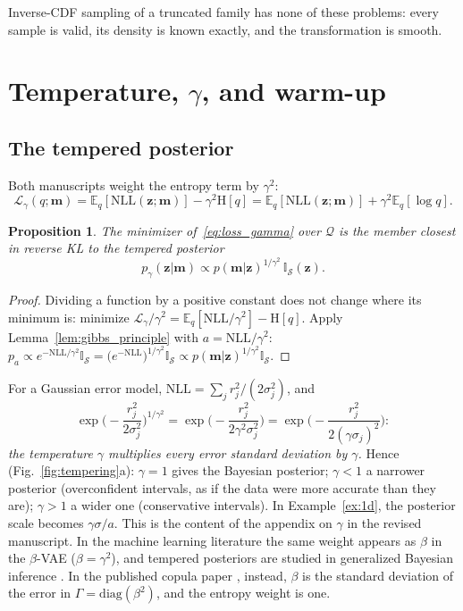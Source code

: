 \documentclass[11pt,a4paper]{article}
\numberwithin{equation}{section}
\theoremstyle{plain}
\newtheorem{proposition}{Proposition}[section]
\theoremstyle{definition}
\theoremstyle{remark}
\newcommand{\m}{\mathbf{m}}
\newcommand{\z}{\mathbf{z}}
\newcommand{\Sset}{\mathcal{S}}
\newcommand{\E}{\mathbb{E}}
\newcommand{\Hent}{\mathrm{H}}
\newcommand{\NLL}{\mathrm{NLL}}
\newcommand{\Lc}{\mathcal{L}}
\newcommand{\ind}{\mathbb{I}}
\begin{document}
Inverse-CDF sampling of a truncated family has none of these problems: every sample is valid, its density is known exactly, and the transformation is smooth.

\section{Temperature, $\gamma$, and warm-up}
\label{sec:tempering}

\subsection{The tempered posterior}
Both manuscripts weight the entropy term by $\gamma^2$:
\begin{equation}
\Lc_\gamma(q;\m)=\E_q[\NLL(\z;\m)]-\gamma^2\Hent[q]=\E_q[\NLL(\z;\m)]+\gamma^2\E_q[\log q].
\label{eq:loss_gamma}
\end{equation}
\begin{proposition}
\label{prop:tempered}
The minimizer of~\eqref{eq:loss_gamma} over $\mathcal Q$ is the member closest in reverse KL to the tempered posterior
\begin{equation}
p_\gamma(\z|\m)\propto p(\m|\z)^{1/\gamma^2}\,\ind_{\Sset}(\z).
\end{equation}
\end{proposition}
\begin{proof}
Dividing a function by a positive constant does not change where its minimum is: minimize $\Lc_\gamma/\gamma^2=\E_q[\NLL/\gamma^2]-\Hent[q]$. Apply Lemma~\ref{lem:gibbs_principle} with $a=\NLL/\gamma^2$: $p_a\propto e^{-\NLL/\gamma^2}\ind_{\Sset}=\big(e^{-\NLL}\big)^{1/\gamma^2}\ind_{\Sset}\propto p(\m|\z)^{1/\gamma^2}\ind_{\Sset}$.
\end{proof}
For a Gaussian error model, $\NLL=\sum_jr_j^2/(2\sigma_j^2)$, and
\begin{equation*}
\exp\Big(-\frac{r_j^2}{2\sigma_j^2}\Big)^{1/\gamma^2}=\exp\Big(-\frac{r_j^2}{2\gamma^2\sigma_j^2}\Big)=\exp\Big(-\frac{r_j^2}{2(\gamma\sigma_j)^2}\Big):
\end{equation*}
\emph{the temperature $\gamma$ multiplies every error standard deviation by $\gamma$.} Hence (Fig.~\ref{fig:tempering}a): $\gamma=1$ gives the Bayesian posterior; $\gamma<1$ a narrower posterior (overconfident intervals, as if the data were more accurate than they are); $\gamma>1$ a wider one (conservative intervals). In Example~\ref{ex:1d}, the posterior scale becomes $\gamma\sigma/a$. This is the content of the appendix on $\gamma$ in the revised manuscript. In the machine learning literature the same weight appears as $\beta$ in the $\beta$-VAE \cite{higgins2017beta} ($\beta=\gamma^2$), and tempered posteriors are studied in generalized Bayesian inference \cite{bissiri2016general}. In the published copula paper \cite{fernandez2026pem}, instead, $\beta$ is the standard deviation of the error in $\Gamma=\mathrm{diag}(\beta^2)$, and the entropy weight is one.
\end{document}
